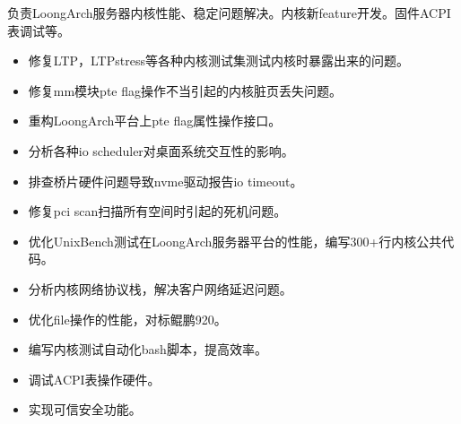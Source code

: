 \documentclass{resume}
\begin{document}
\begin{onehalfspacing}
负责LoongArch服务器内核性能、稳定问题解决。内核新feature开发。固件ACPI表调试等。
\begin{itemize}
  \item 修复LTP，LTPstress等各种内核测试集测试内核时暴露出来的问题。
  \item 修复mm模块pte flag操作不当引起的内核脏页丢失问题。
  \item 重构LoongArch平台上pte flag属性操作接口。
  \item 分析各种io scheduler对桌面系统交互性的影响。
  \item 排查桥片硬件问题导致nvme驱动报告io timeout。
  \item 修复pci scan扫描所有空间时引起的死机问题。
  \item 优化UnixBench测试在LoongArch服务器平台的性能，编写300+行内核公共代码。
  \item 分析内核网络协议栈，解决客户网络延迟问题。
  \item 优化file操作的性能，对标鲲鹏920。
  \item 编写内核测试自动化bash脚本，提高效率。
  \item 调试ACPI表操作硬件。
  \item 实现可信安全功能。
\end{itemize}
\end{onehalfspacing}



\end{document}
